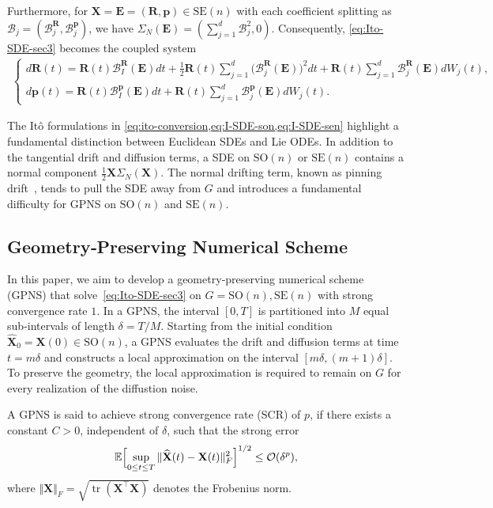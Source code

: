 \documentclass[11pt, a4paper, onecolumn]{article}
\newcommand{\SOn}{\mathrm{SO}(n)}
\newcommand{\SEn}{\mathrm{SE}(n)}
\newcommand{\X}{\bf{X}}
\newcommand{\bfE}{\bf{E}}
\newcommand{\bfR}{\mathbf{R}}
\newcommand{\B}{\mathcal{B}}
\newcommand{\hatX}{\widehat{\bf X}}
\renewcommand{\bf}[1]{\mathbf{#1}}
\newcommand{\nm}[1]{\mathsf{#1}}
\newcommand{\calO}{\mathcal{O}}
\newcommand{\half}{{\frac{1}{2}}}
\begin{document}
Furthermore, for $\mathbf X=\mathbf E = (\mathbf R,\mathbf p) \in \SEn$ with each coefficient splitting as
$\mathcal B_{j}=(\B^{\bfR}_{j},\B^{\bf p}_{j})$, we have $\nm \Sigma_{N} (\bfE)= (\sum_{j=1}^d \B_j^2 , 0)$. Consequently, \cref{eq:Ito-SDE-sec3} becomes the coupled system
\begin{align}\label{eq:I-SDE-sen}
    \begin{cases}
        d\mathbf R(t) =\mathbf R(t)\B^{\mathbf R}_{I}(\bfE) dt +\half\mathbf R(t) \sum_{j=1}^{d} \bigl(\B^{\mathbf R}_{j}(\bfE)\bigr)^{2}dt +\mathbf R(t)\sum_{j=1}^{d} \B^{\mathbf R}_{j}(\bfE) dW_{j}(t), \\
        d\mathbf p(t) = \mathbf R(t)\B^{\bf p}_{I}(\bfE) dt + \mathbf R(t)\sum_{j=1}^{d}\B^{\bf p}_{j}(\bfE)dW_{j}(t).
    \end{cases}
\end{align}


The It\^o formulations in \cref{eq:ito-conversion,eq:I-SDE-son,eq:I-SDE-sen} highlight a fundamental distinction between Euclidean SDEs and Lie ODEs.  In addition to the tangential drift and diffusion terms, a SDE on $\SOn$ or $\SEn$ contains a normal component $\half\bf X \nm \Sigma_N(\X)$. The normal drifting term, known as pinning drift~\cite{solo2024stratonovich}, tends to pull the SDE away from $G$ and introduces a fundamental difficulty for GPNS on $\SOn$ and $\SEn$.

\subsection{Geometry‑Preserving Numerical Scheme}
In this paper, we aim to develop a geometry‑preserving numerical scheme (GPNS) that solve~\cref{eq:Ito-SDE-sec3} on $G=\SOn, \SEn$ with strong convergence rate $1$. In a GPNS, the interval $[0,T]$ is partitioned into $M$ equal sub‑intervals of length $\delta = T/M$. Starting from the initial condition $\widehat{\mathbf X}_0=\mathbf X(0)\in \mathrm{SO}(n)$, a GPNS evaluates the drift and diffusion terms at time $t=m\delta$ and constructs a local approximation on the interval $[m\delta,(m+1)\delta]$. To preserve the geometry, the local approximation is required to remain on $G$ for every realization of the diffustion noise.

A GPNS is said to achieve strong convergence rate (SCR) of $p$, if there exists a constant $C>0$, independent of $\delta$, such that the strong error
\begin{align*}
    \mathbb E\Bigl[\sup_{0 \le t \le T} \Vert \hatX(t) - \X(t) \Vert_{F}^{2} \Bigr]^{1/2} \le \calO(\delta^{ p}),
\end{align*}
where $\Vert \X \Vert_{F} = \sqrt{\operatorname{tr}(\X^{\top}\X)}$ denotes the Frobenius norm.
\end{document}
